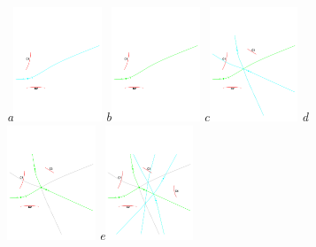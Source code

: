\begin{figure}[ht]
\center
{\footnotesize\textit{a}}\includegraphics[width=0.235\textwidth]{figs/incremental-voro-02-01.pdf}
{\footnotesize\textit{b}}\includegraphics[width=0.235\textwidth]{figs/incremental-voro-02-02.pdf}
{\footnotesize\textit{c}}\includegraphics[width=0.235\textwidth]{figs/incremental-voro-03-01.pdf}
{\footnotesize\textit{d}}\includegraphics[width=0.235\textwidth]{figs/incremental-voro-03-02.pdf}
{\footnotesize\textit{e}}\includegraphics[width=0.235\textwidth]{figs/incremental-voro-04-01.pdf}

\end{figure}
